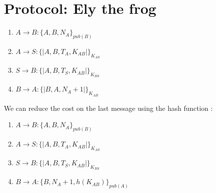 \section{Protocol: Ely the frog}

\begin{enumerate}
    \item $ A \rightarrow B : \{A, B, N_A\}_{pub(B)}$
    \item $ A \rightarrow S : \{|A, B, T_{A}, K_{AB}|\}_{K_{AS}}$
    \item $ S \rightarrow B : \{|A, B, T_{S}, K_{AB}|\}_{K_{BS}}$
    \item $ B \rightarrow A : \{|B, A, N_A+1|\}_{K_{AB}}$
\end{enumerate}

We can reduce the cost on the last message using the hash function :
\begin{enumerate}
    \item $ A \rightarrow B : \{A, B, N_A\}_{pub(B)}$
    \item $ A \rightarrow S : \{|A, B, T_{A}, K_{AB}|\}_{K_{AS}}$
    \item $ S \rightarrow B : \{|A, B, T_{S}, K_{AB}|\}_{K_{BS}}$
    \item $ B \rightarrow A : \{B, N_A +1, h(K_{AB})\}_{pub(A)}$
\end{enumerate}